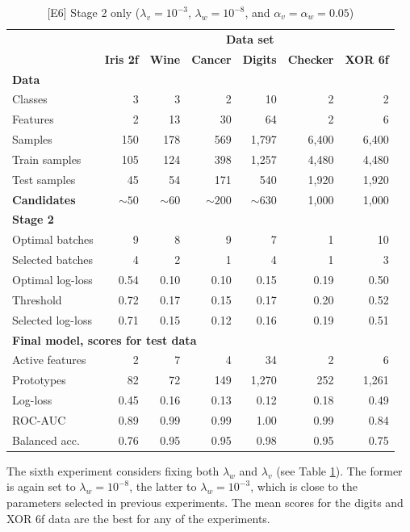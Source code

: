 \begin{table}
\caption{[E6] Stage 2 only ($\lambda_v=10^{-3}$, $\lambda_w=10^{-8}$, and $\alpha_v=\alpha_w=0.05$)}
\label{tab_e6}
%
\begin{center}
\small
\begin{tabular}{|lrrrrrr|}
\hline
&\multicolumn{6}{c|}{\textbf{\hrulefill\ Data set \hrulefill}}\\
&\textbf{Iris 2f}&\textbf{Wine}&\textbf{Cancer}&\textbf{Digits}&\textbf{Checker}&\textbf{XOR 6f}\\
\multicolumn{7}{|l|}{\textbf{Data}}\\
Classes&3&3&2&10&2&2\\
Features&2&13&30&64&2&6\\
Samples&150&178&569&1,797&6,400&6,400\\
Train samples&105&124&398&1,257&4,480&4,480\\
Test samples&45&54&171&540&1,920&1,920\\
\textbf{Candidates}&$\sim50$&$\sim60$&$\sim200$&$\sim630$&1,000&1,000\\
\multicolumn{7}{|l|}{\textbf{Stage 2}}\\
Optimal batches&9&8&9&7&1&10\\
Selected batches&4&2&1&4&1&3\\
Optimal log-loss&0.54&0.10&0.10&0.15&0.19&0.50\\
Threshold&0.72&0.17&0.15&0.17&0.20&0.52\\
Selected log-loss&0.71&0.15&0.12&0.16&0.19&0.51\\
\multicolumn{7}{|l|}{\textbf{Final model, scores for test data}}\\
Active features&2&7&4&34&2&6\\
Prototypes&82&72&149&1,270&252&1,261\\
Log-loss&0.45&0.16&0.13&0.12&0.18&0.49\\
ROC-AUC&0.89&0.99&0.99&1.00&0.99&0.84\\
Balanced acc.&0.76&0.95&0.95&0.98&0.95&0.75\\
\hline
\end{tabular}
\end{center}
\end{table}
%
The sixth experiment considers fixing both $\lambda_w$ and $\lambda_v$ (see Table \ref{tab_e6}).
The former is again set to $\lambda_w=10^{-8}$, the latter to $\lambda_w=10^{-3}$, which is close to the parameters selected in previous experiments.
The mean scores for the digits and XOR 6f data are the best for any of the experiments.

